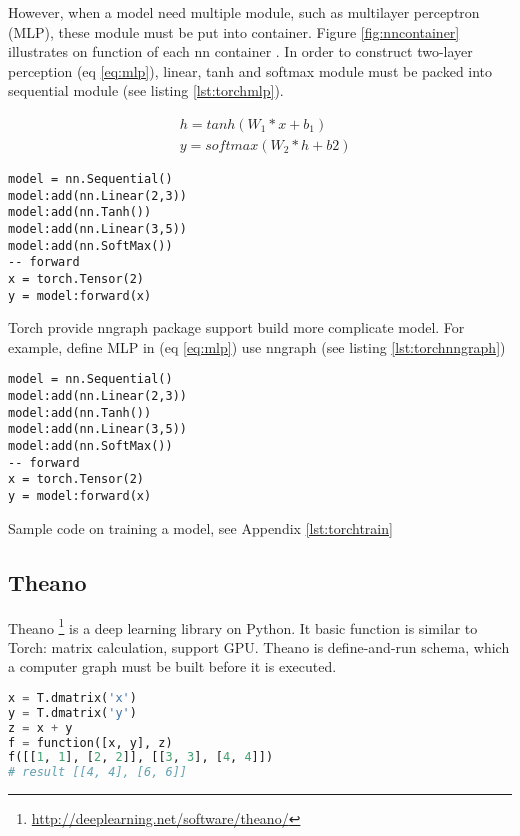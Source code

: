 However, when a model need multiple module, such as multilayer perceptron (MLP), these module must be put into container. Figure \ref{fig:nncontainer} illustrates on function of each nn container . In order to construct two-layer perception (eq \ref{eq:mlp}), linear, tanh and softmax module must be packed into sequential module (see listing \ref{lst:torchmlp}).

\begin{equation}
\label{eq:mlp}
\begin{aligned}
&h = tanh(W_1*x + b_1) \\
&y = softmax(W_2*h + b2)
\end{aligned}
\end{equation}


\begin{lstlisting}[caption={MLP in Torch},label={lst:torchmlp}, language={[5.1]Lua}]
model = nn.Sequential()
model:add(nn.Linear(2,3))
model:add(nn.Tanh())
model:add(nn.Linear(3,5))
model:add(nn.SoftMax())
-- forward
x = torch.Tensor(2)
y = model:forward(x)
\end{lstlisting}

Torch provide nngraph package support build more complicate model. For example, define MLP in (eq \ref{eq:mlp}) use nngraph (see listing \ref{lst:torchnngraph})

\begin{lstlisting}[caption={MLP using nngraph},label={lst:torchnngraph}, language={[5.1]Lua}]
model = nn.Sequential()
model:add(nn.Linear(2,3))
model:add(nn.Tanh())
model:add(nn.Linear(3,5))
model:add(nn.SoftMax())
-- forward
x = torch.Tensor(2)
y = model:forward(x)
\end{lstlisting}

Sample code on training a model, see Appendix \ref{lst:torchtrain}

\subsection{Theano}
Theano \footnote{\url{http://deeplearning.net/software/theano/}} is a deep learning library on Python. It basic function is similar to Torch: matrix calculation, support GPU. Theano is define-and-run schema, which a computer graph must be built before it is executed.

\begin{lstlisting}[caption={Define function in Theano},label={lst:theanof}, language={python}]
x = T.dmatrix('x')
y = T.dmatrix('y')
z = x + y
f = function([x, y], z)
f([[1, 1], [2, 2]], [[3, 3], [4, 4]])
# result [[4, 4], [6, 6]]
\end{lstlisting}

